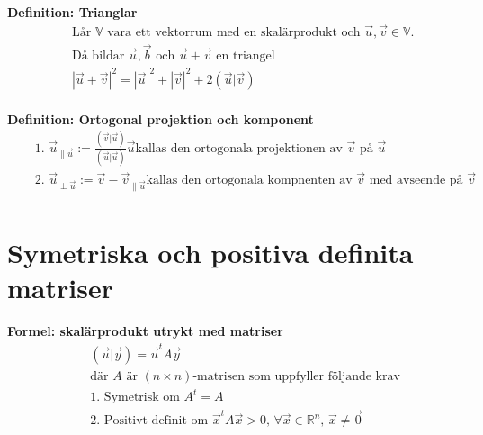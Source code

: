 \textbf{Definition: Trianglar}
\begin{align*}
  &\quad  \text{Lår $\mathbb{V}$ vara ett vektorrum med en skalärprodukt och $\vec{u},\vec{v}\in\mathbb{V}$. } \\
  &\quad  \text{Då bildar $\vec{u},\vec{b}$ och $\vec{u}+\vec{v}$ en triangel} \\
  &\quad  {|\vec{u}+\vec{v}|}^2 = {|\vec{u}|}^2 + {|\vec{v}|}^2 + 2(\vec{u}|\vec{v}) \\
\end{align*}

\textbf{Definition: Ortogonal projektion och komponent}
\begin{align*}
  &\quad  \text{1. } \vec{u}_{\|\vec{u}} := \frac{(\vec{v}|\vec{u})}{(\vec{u}|\vec{u})}\vec{u} 
  \text{kallas den ortogonala projektionen av $\vec{v}$ på $\vec{u}$} \\
  &\quad  \text{2. } \vec{u}_{\perp{\vec{u}}} := \vec{v} - \vec{v}_{\|\vec{u}}
  \text{kallas den ortogonala kompnenten av $\vec{v}$ med avseende på $\vec{v}$} \\    
\end{align*}


\newpage

\section{Symetriska och positiva definita matriser}
\textbf{Formel: skalärprodukt utrykt med matriser}
\begin{align*}
  &\quad  (\vec{u}|\vec{y}) = \vec{u}^t A \vec{y} \\
  &\quad  \text{där $A$ är $(n \times n)$-matrisen som uppfyller följande krav} \\
  &\quad  \text{1. Symetrisk om } A^t=A \\
  &\quad  \text{2. Positivt definit om } \vec{x}^t A \vec{x} > 0, \, \forall \vec{x}\in\mathbb{R}^n, \, \vec{x}\neq \vec{0}  \\
\end{align*}

